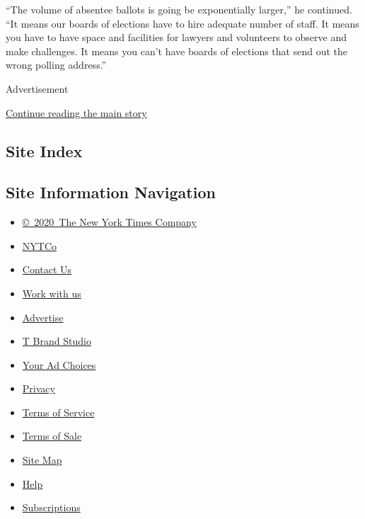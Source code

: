 ``The volume of absentee ballots is going be exponentially larger,'' he
continued. ``It means our boards of elections have to hire adequate
number of staff. It means you have to have space and facilities for
lawyers and volunteers to observe and make challenges. It means you
can't have boards of elections that send out the wrong polling
address.''

Advertisement

\protect\hyperlink{after-bottom}{Continue reading the main story}

\hypertarget{site-index}{%
\subsection{Site Index}\label{site-index}}

\hypertarget{site-information-navigation}{%
\subsection{Site Information
Navigation}\label{site-information-navigation}}

\begin{itemize}
\tightlist
\item
  \href{https://help.nytimes.com/hc/en-us/articles/115014792127-Copyright-notice}{©~2020~The
  New York Times Company}
\end{itemize}

\begin{itemize}
\tightlist
\item
  \href{https://www.nytco.com/}{NYTCo}
\item
  \href{https://help.nytimes.com/hc/en-us/articles/115015385887-Contact-Us}{Contact
  Us}
\item
  \href{https://www.nytco.com/careers/}{Work with us}
\item
  \href{https://nytmediakit.com/}{Advertise}
\item
  \href{http://www.tbrandstudio.com/}{T Brand Studio}
\item
  \href{https://www.nytimes.com/privacy/cookie-policy\#how-do-i-manage-trackers}{Your
  Ad Choices}
\item
  \href{https://www.nytimes.com/privacy}{Privacy}
\item
  \href{https://help.nytimes.com/hc/en-us/articles/115014893428-Terms-of-service}{Terms
  of Service}
\item
  \href{https://help.nytimes.com/hc/en-us/articles/115014893968-Terms-of-sale}{Terms
  of Sale}
\item
  \href{https://spiderbites.nytimes.com}{Site Map}
\item
  \href{https://help.nytimes.com/hc/en-us}{Help}
\item
  \href{https://www.nytimes.com/subscription?campaignId=37WXW}{Subscriptions}
\end{itemize}
